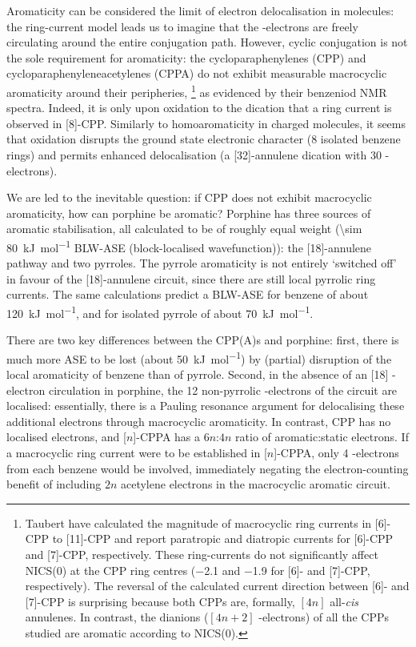 		Aromaticity can be considered the limit of electron delocalisation in molecules: the ring-current model leads us to imagine that the \pii{}-electrons are freely circulating around the entire conjugation path. However, cyclic conjugation is not the sole requirement for aromaticity: the cycloparaphenylenes (CPP) and cycloparaphenyleneacetylenes (CPPA) do not exhibit measurable macrocyclic aromaticity around their peripheries,%
%
			\footnote{Taubert  have calculated the magnitude of macrocyclic ring currents in [6]-CPP to [11]-CPP and report paratropic and diatropic currents for [6]-CPP and [7]-CPP, respectively. These ring-currents do not significantly affect NICS(0) at the CPP ring centres (\SI{-2.1}{\ppm} and \SI{-1.9}{\ppm} for [6]- and [7]-CPP, respectively). The reversal of the calculated current direction between [6]- and [7]-CPP is surprising because both CPPs are, formally, $[4n]$ all-\textit{cis} annulenes. In contrast, the dianions  ($[4n+2]$ \pii{}-electrons) of all the CPPs studied are aromatic according to NICS(0).\autocite{Taubert2010}} %
		as evidenced by their benzeniod NMR spectra.\autocite{Kawase2007,Jasti2011,Xia2012} Indeed, it is only upon oxidation to the dication that a ring current is observed in [8]-CPP.\autocite{Toriumi2015} Similarly to homoaromaticity in charged molecules, it seems that oxidation disrupts the ground state electronic character (8 isolated benzene rings) and permits enhanced delocalisation (a [32]-annulene dication with 30 \pii{}-electrons). 

		We are led to the inevitable question: if CPP does not exhibit macrocyclic aromaticity, how can porphine be aromatic? Porphine has three sources of aromatic stabilisation, all calculated to be of roughly equal weight (\SI{\sim 80}{\kilo\joule\per\mole} BLW-ASE (block-localised wavefunction)): the [18]-annulene pathway and two pyrroles.\autocite{Wu2013} The pyrrole aromaticity is not entirely `switched off' in favour of the [18]-annulene circuit, since there are still local pyrrolic ring currents. The same calculations predict a BLW-ASE for benzene of about \SI{120}{\kilo\joule\per\mole}, and for isolated pyrrole of about \SI{70}{\kilo\joule\per\mole}.\autocite{Wu2013} 

		There are two key differences between the CPP(A)s and porphine: first, there is much more ASE to be lost (about \SI{50}{\kilo\joule\per\mole}) by (partial) disruption of the local aromaticity of benzene than of pyrrole. Second, in the absence of an [18] \pii{}-electron circulation in porphine, the 12 non-pyrrolic \pii{}-electrons of the circuit are localised: essentially, there is a Pauling resonance argument for delocalising these additional electrons through macrocyclic aromaticity. In contrast, CPP has no localised electrons, and [$n$]-CPPA has a $6n$:$4n$ ratio of aromatic:static electrons. If a macrocyclic ring current were to be established in [$n$]-CPPA, only 4 \pii{}-electrons from each benzene would be involved, immediately negating the electron-counting benefit of including $2n$ acetylene electrons in the macrocyclic aromatic circuit.\autocite{Bleszynski-Jayich2009}

